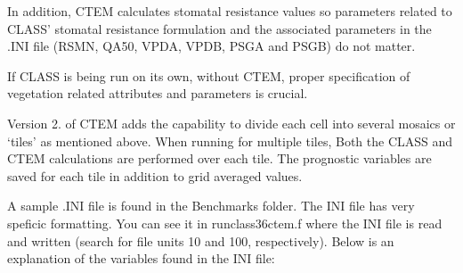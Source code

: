 In addition, C\+T\+E\+M calculates stomatal resistance values so parameters related to C\+L\+A\+S\+S’ stomatal resistance formulation and the associated parameters in the .I\+N\+I file (R\+S\+M\+N, Q\+A50, V\+P\+D\+A, V\+P\+D\+B, P\+S\+G\+A and P\+S\+G\+B) do not matter.

If C\+L\+A\+S\+S is being run on its own, without C\+T\+E\+M, proper specification of vegetation related attributes and parameters is crucial.

Version 2. of C\+T\+E\+M adds the capability to divide each cell into several mosaics or ‘tiles’ as mentioned above. When running for multiple tiles, Both the C\+L\+A\+S\+S and C\+T\+E\+M calculations are performed over each tile. The prognostic variables are saved for each tile in addition to grid averaged values.

A sample .I\+N\+I file is found in the Benchmarks folder. The I\+N\+I file has very speficic formatting. You can see it in runclass36ctem.\+f where the I\+N\+I file is read and written (search for file units 10 and 100, respectively). Below is an explanation of the variables found in the I\+N\+I file\+:


